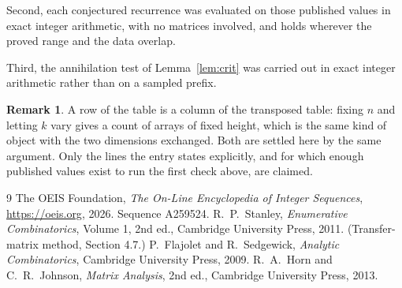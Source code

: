 \documentclass[11pt,a4paper]{article}
\theoremstyle{plain}
\theoremstyle{definition}
\newtheorem{remark}[theorem]{Remark}
\begin{document}
Second, each conjectured recurrence was evaluated on those published values in exact
integer arithmetic, with no matrices involved, and holds wherever the proved range and the
data overlap.

Third, the annihilation test of Lemma~\ref{lem:crit} was carried out in exact integer
arithmetic rather than on a sampled prefix.

\begin{remark}
A row of the table is a column of the transposed table: fixing $n$ and letting $k$ vary gives a
count of arrays of fixed height, which is the same kind of object with the two dimensions
exchanged. Both are settled here by the same argument. Only the lines the entry states
explicitly, and for which enough published values exist to run the first check above, are
claimed.
\end{remark}

\begin{thebibliography}{9}
 The OEIS Foundation, \emph{The On-Line Encyclopedia of Integer
Sequences}, \url{https://oeis.org}, 2026. Sequence A259524.
 R.~P.~Stanley, \emph{Enumerative Combinatorics}, Volume 1, 2nd ed.,
Cambridge University Press, 2011. (Transfer-matrix method, Section 4.7.)
 P.~Flajolet and R.~Sedgewick, \emph{Analytic Combinatorics}, Cambridge
University Press, 2009.
 R.~A.~Horn and C.~R.~Johnson, \emph{Matrix Analysis}, 2nd ed., Cambridge
University Press, 2013.
\end{thebibliography}
\end{document}

